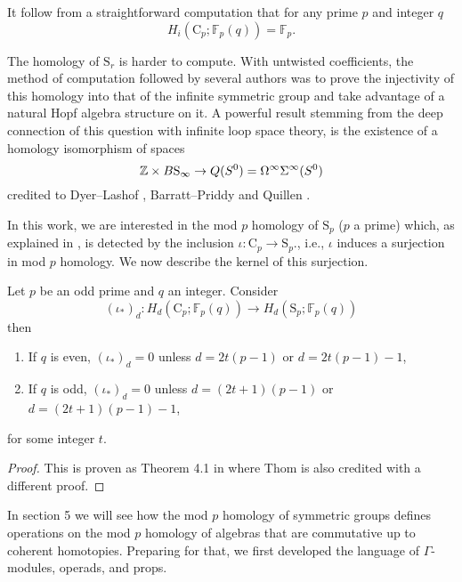 It follow from a straightforward computation that for any prime $p$ and integer $q$
\begin{equation*}
H_i(\mathrm{C}_p; \mathbb{F}_p(q)) = \mathbb{F}_p.
\end{equation*}

The homology of $\mathrm{S}_r$ is harder to compute.
With untwisted coefficients, the method of computation followed by several authors was to prove the injectivity of this homology into that of the infinite symmetric group and take advantage of a natural Hopf algebra structure on it.
A powerful result stemming from the deep connection of this question with infinite loop space theory, is the existence of a homology isomorphism of spaces
\begin{equation*}
\mathbb{Z} \times B\mathrm{S}_\infty \to Q(S^0) = \Omega^\infty \Sigma^\infty (S^0)
\end{equation*}
credited to Dyer--Lashof \cite{dyer62lashof}, Barratt--Priddy and Quillen \cite{barratt1972priddy}.

In this work, we are interested in the mod $p$ homology of $\mathrm{S}_p$ ($p$ a prime) which, as explained in \cite[Corollary~VI.1.4]{adem2004milgram}, is detected by the inclusion $\iota \colon \mathrm{C}_p \to \mathrm{S}_p$., i.e., $\iota$ induces a surjection in mod $p$ homology.
We now describe the kernel of this surjection.

\begin{lemma} \label{lem: Thom's theorem}
	Let $p$ be an odd prime and $q$ an integer.
	Consider
	\begin{equation*}
	(\iota_\ast)_d \colon H_d(\mathrm{C}_p; \mathbb{F}_p(q)) \to H_d(\mathrm{S}_p; \mathbb{F}_p(q))
	\end{equation*}
	then
	\begin{enumerate}
		\item If $q$ is even, $(\iota_\ast)_d = 0$ unless $d = 2t(p-1)$ or $d = 2t(p-1) - 1$,
		\item If $q$ is odd, $(\iota_\ast)_d = 0$ unless $d = (2t+1)(p-1)$ or $d = (2t+1)(p-1)-1$,
	\end{enumerate}
	for some integer $t$.
\end{lemma}

\begin{proof}
	This is proven as Theorem 4.1 in \cite{steenrod53cyclic} where Thom is also credited with a different proof.
\end{proof}

In section 5 we will see how the mod $p$ homology of symmetric groups defines operations on the mod $p$ homology of algebras that are commutative up to coherent homotopies.
Preparing for that, we first developed the language of $\Gamma$-modules, operads, and props.